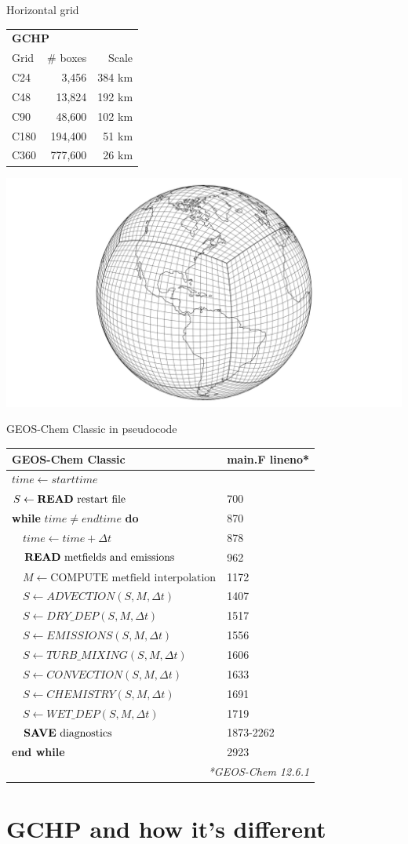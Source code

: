 \documentclass[10pt]{beamer}
\newcommand{\gccpseudocode}{%
    \small
    \setlength{\tabcolsep}{20pt}
    \begin{table}[]
    \begin{tabular}{ll}
    \hline
    \textbf{GEOS-Chem Classic} & \textbf{main.F lineno}* \\ \hline
    $time \leftarrow starttime$ &  \\
    $S \leftarrow \text{\textbf{READ} restart file}$ &  700 \\
    \textbf{while} $time \neq endtime$ \textbf{do} & 870 \\
    $\quad time \leftarrow time + \Delta t$ & 878 \\
    $\quad \text{\textbf{READ} metfields and emissions}$ & 962 \\
    $\quad M \leftarrow \text{COMPUTE metfield interpolation}$ & 1172 \\
    $\quad S \leftarrow ADVECTION(S, M, \Delta t)$ & 1407 \\
    $\quad S \leftarrow DRY\_DEP(S, M, \Delta t)$ & 1517 \\
    $\quad S \leftarrow EMISSIONS(S, M, \Delta t)$ & 1556 \\
    $\quad S \leftarrow TURB\_MIXING(S, M, \Delta t)$ & 1606 \\
    $\quad S \leftarrow CONVECTION(S, M, \Delta t)$ & 1633 \\
    $\quad S \leftarrow CHEMISTRY(S, M, \Delta t)$& 1691 \\
    $\quad S \leftarrow WET\_DEP(S, M, \Delta t)$ & 1719 \\
    $\quad \text{\textbf{SAVE} diagnostics}$ & 1873-2262 \\
    \textbf{end while} & 2923 \\ \hline
    \multicolumn{2}{r}{\fontsize{4}{4}\selectfont\textit{*GEOS-Chem 12.6.1}} \\
    \end{tabular}
    \end{table}
}
\begin{document}
\begin{frame}[fragile]{Horizontal grid}
    \small
    \begin{minipage}[c]{0.5\textwidth}
        \begin{table}[]
        \begin{tabular}{lrr}
        \hline
            \multicolumn{3}{l}{\textbf{GCHP}} \\ 
            Grid & \# boxes & Scale \\ 
            \hline
            C24 & 3,456 & 384 km\\ 
            C48 & 13,824 & 192 km\\ 
            C90 & 48,600 & 102 km \\ 
            C180 & 194,400 & 51 km \\ 
            C360 & 777,600 & 26 km \\ 
            \hline
        \end{tabular}
        \end{table}
    \end{minipage}
    \begin{minipage}[c]{0.49\textwidth}
        \includegraphics[height=0.4\textheight]{hgrid_c24.png}
    \end{minipage}
\end{frame}

\begin{frame}{GEOS-Chem Classic in pseudocode}
    \vspace{3mm}
    \gccpseudocode
\end{frame}

\section{GCHP and how it's different}
\end{document}
